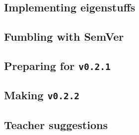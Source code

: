 \documentclass[../main.tex]{subfiles}
\begin{document}
\newpage

\subsection{Implementing eigenstuffs\label{development:implementing-eigenstuffs}}


\newpage

\subsection{Fumbling with SemVer\label{development:fumbling-with-semver}}


\newpage

\subsection{Preparing for \texttt{v0.2.1}\label{development:preparing-for-v0.2.1}}


\newpage

\subsection{Making \texttt{v0.2.2}\label{development:making-v0.2.2}}


\newpage

\subsection{Teacher suggestions\label{development:teacher-suggestions}}

\end{document}
